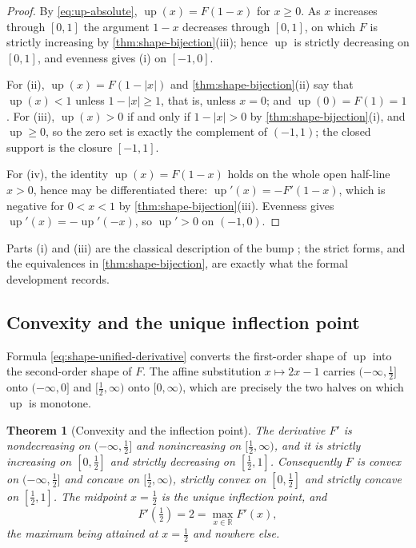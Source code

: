 \documentclass[11pt,oneside]{article}
\newtheorem{theorem}{Theorem}[section]
\theoremstyle{definition}
\theoremstyle{remark}
\newcommand{\R}{\mathbb R}
\newcommand{\Up}{\operatorname{up}}
\begin{document}
\begin{proof}
By \eqref{eq:up-absolute}, $\Up(x)=F(1-x)$ for $x\ge0$.  As $x$ increases through $[0,1]$ the
argument $1-x$ decreases through $[0,1]$, on which $F$ is strictly increasing by
\cref{thm:shape-bijection}(iii); hence $\Up$ is strictly decreasing on $[0,1]$, and evenness
gives (i) on $[-1,0]$.

For (ii), $\Up(x)=F(1-|x|)$ and \cref{thm:shape-bijection}(ii) say that $\Up(x)<1$ unless
$1-|x|\ge1$, that is, unless $x=0$; and $\Up(0)=F(1)=1$.  For (iii), $\Up(x)>0$ if and only
if $1-|x|>0$ by \cref{thm:shape-bijection}(i), and $\Up\ge0$, so the zero set is exactly the
complement of $(-1,1)$; the closed support is the closure $[-1,1]$.

For (iv), the identity $\Up(x)=F(1-x)$ holds on the whole open half-line $x>0$, hence may be
differentiated there: $\Up'(x)=-F'(1-x)$, which is negative for $0<x<1$ by
\cref{thm:shape-bijection}(iii).  Evenness gives $\Up'(x)=-\Up'(-x)$, so $\Up'>0$ on
$(-1,0)$.
\end{proof}

Parts (i) and (iii) are the classical description of the bump \cite{rvachev1990,arias1982};
the strict forms, and the equivalences in \cref{thm:shape-bijection}, are exactly what the
formal development records.

\subsection{Convexity and the unique inflection point}
\label{shape:convexity}

Formula \eqref{eq:shape-unified-derivative} converts the first-order shape of $\Up$ into the
second-order shape of $F$.  The affine substitution $x\mapsto2x-1$ carries
$(-\infty,\tfrac12]$ onto $(-\infty,0]$ and $[\tfrac12,\infty)$ onto $[0,\infty)$, which are
precisely the two halves on which $\Up$ is monotone.

\begin{theorem}[Convexity and the inflection point]
\label{thm:shape-convexity}
The derivative $F'$ is nondecreasing on $(-\infty,\tfrac12]$ and nonincreasing on
$[\tfrac12,\infty)$, and it is strictly increasing on $[0,\tfrac12]$ and strictly decreasing
on $[\tfrac12,1]$.  Consequently $F$ is convex on $(-\infty,\tfrac12]$ and concave on
$[\tfrac12,\infty)$, strictly convex on $[0,\tfrac12]$ and strictly concave on
$[\tfrac12,1]$.  The midpoint $x=\tfrac12$ is the unique inflection point, and
\begin{equation}
 F'(\tfrac12)=2=\max_{x\in\R}F'(x),                       \label{eq:shape-max-slope}
\end{equation}
the maximum being attained at $x=\tfrac12$ and nowhere else.
\end{theorem}
\end{document}
